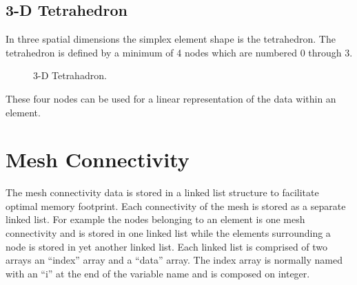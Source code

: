 \documentclass[letterpaper]{article}
\begin{document}
\subsection{3-D Tetrahedron}
In three spatial dimensions the simplex element shape is the tetrahedron.  The tetrahedron is defined by a minimum of 4 nodes which are numbered 0 through 3.
\begin{figure}
\centering
{}
\caption{3-D Tetrahadron.}
\label{fig:c3_tet}
\end{figure}
These four nodes can be used for a linear representation of the data within an element.  


\section{Mesh Connectivity}
The mesh connectivity data is stored in a linked list structure to facilitate optimal memory footprint.  Each connectivity of the mesh is stored as a separate linked list.  For example the nodes belonging to an element is one mesh connectivity and is stored in one linked list while the elements surrounding a node is stored in yet another linked list.  Each linked list is comprised of two arrays an ``index'' array and a ``data'' array.  The index array is normally named with an ``i'' at the end of the variable name and is composed on integer. 
\end{document}
